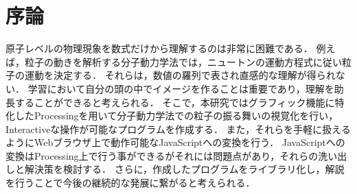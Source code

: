 \chapter{序論}

原子レベルの物理現象を数式だけから理解するのは非常に困難である．
例えば，粒子の動きを解析する分子動力学法では，ニュートンの運動方程式に従い粒子の運動を決定する．
それらは，数値の羅列で表され直感的な理解が得られない．
学習において自分の頭の中でイメージを作ることは重要であり，理解を助長することができると考えられる．
そこで，本研究ではグラフィック機能に特化したProcessingを用いて分子動力学法での粒子の振る舞いの視覚化を行い，
Interactiveな操作が可能なプログラムを作成する．
また，それらを手軽に扱えるようにWebブラウザ上で動作可能なJavaScriptへの変換を行う．
JavaScriptへの変換はProcessing上で行う事ができるがそれには問題点があり，それらの洗い出しと解決策を検討する．
さらに，作成したプログラムをライブラリ化し，解説を行うことで今後の継続的な発展に繋がると考えられる．



